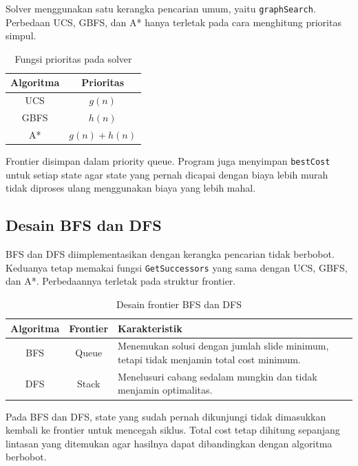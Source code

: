 Solver menggunakan satu kerangka pencarian umum, yaitu
\texttt{graphSearch}. Perbedaan UCS, GBFS, dan A* hanya terletak pada
cara menghitung prioritas simpul.

\begin{table}[H]
    \centering
    \begin{tabular}{|c|c|}
        \hline
        \textbf{Algoritma} & \textbf{Prioritas} \\
        \hline
        UCS & $g(n)$ \\
        \hline
        GBFS & $h(n)$ \\
        \hline
        A* & $g(n) + h(n)$ \\
        \hline
    \end{tabular}
    \caption{Fungsi prioritas pada solver}
\end{table}

Frontier disimpan dalam priority queue. Program juga menyimpan
\texttt{bestCost} untuk setiap state agar state yang pernah dicapai
dengan biaya lebih murah tidak diproses ulang menggunakan biaya yang
lebih mahal.

\subsection{Desain BFS dan DFS}\label{sub:Desain BFS DFS}

BFS dan DFS diimplementasikan dengan kerangka pencarian tidak berbobot.
Keduanya tetap memakai fungsi \texttt{GetSuccessors} yang sama dengan
UCS, GBFS, dan A*. Perbedaannya terletak pada struktur frontier.

\begin{table}[H]
    \centering
    \begin{tabular}{|c|c|L{7cm}|}
        \hline
        \textbf{Algoritma} & \textbf{Frontier} & \textbf{Karakteristik} \\
        \hline
        BFS & Queue & Menemukan solusi dengan jumlah slide minimum, tetapi tidak menjamin total cost minimum. \\
        \hline
        DFS & Stack & Menelusuri cabang sedalam mungkin dan tidak menjamin optimalitas. \\
        \hline
    \end{tabular}
    \caption{Desain frontier BFS dan DFS}
\end{table}

Pada BFS dan DFS, state yang sudah pernah dikunjungi tidak dimasukkan
kembali ke frontier untuk mencegah siklus. Total cost tetap dihitung
sepanjang lintasan yang ditemukan agar hasilnya dapat dibandingkan
dengan algoritma berbobot.

